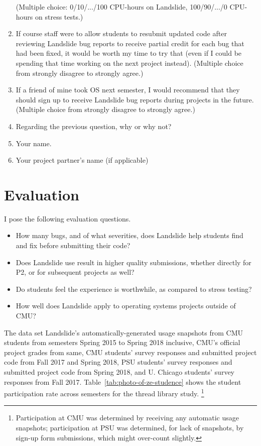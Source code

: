 \begin{enumerate}
		(Multiple choice: 0/10/.../100 CPU-hours on Landslide, 100/90/.../0 CPU-hours on stress tests.)
	\item If course staff were to allow students to resubmit updated code after reviewing Landslide bug reports to receive partial credit for each bug that had been fixed, it would be worth my time to try that (even if I could be spending that time working on the next project instead).
		(Multiple choice from strongly disagree to strongly agree.)
	\item If a friend of mine took OS next semester, I would recommend that they should sign up to receive Landslide bug reports during projects in the future.
		(Multiple choice from strongly disagree to strongly agree.)
	\item Regarding the previous question, why or why not?
	\item Your name.
	\item Your project partner's name (if applicable)
\end{enumerate}


\section{Evaluation}

I pose the following evaluation questions.

\begin{itemize}
	\item How many bugs, and of what severities, does Landslide help students find and fix before submitting their code?
	\item Does Landslide use result in higher quality submissions, whether directly for P2, or for subsequent projects as well?
	\item Do students feel the experience is worthwhile, as compared to stress testing?
	\item How well does Landslide apply to operating systems projects outside of CMU?
\end{itemize}
\vspace{1em}

The data set  Landslide's automatically-generated usage snapshots
from CMU students from semesters Spring 2015 to Spring 2018 inclusive,
CMU's official project grades from same,
CMU students' survey responses and submitted project code from Fall 2017 and Spring 2018,
PSU students' survey responses and submitted project code from Spring 2018,
and U. Chicago students' survey responses from Fall 2017.
Table~\ref{tab:photo-of-ze-studence} shows the student participation rate across semesters
for the thread library study.%
\footnote{
Participation at CMU was determined by receiving any automatic usage snapshots;
participation at PSU was determined, for lack of snapshots, by sign-up form submissions, which might over-count slightly.
}

